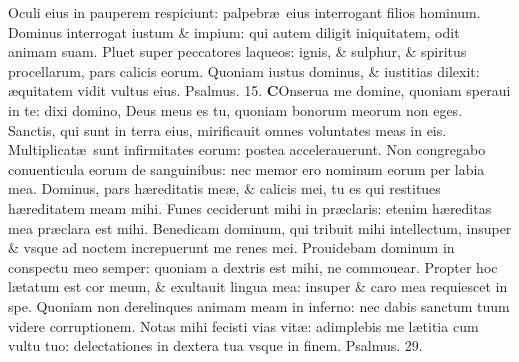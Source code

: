 \documentclass[a5paper,10pt]{book}
\def\ae{æ}
\begin{document}
\begin{multicols*}{2}
\newline \color{red} O\color{black}culi eius in pauperem respiciunt: palpebr\ae \ eius interrogant filios hominum.
\newline \color{red} D\color{black}ominus interrogat iustum \& impium: qui autem diligit iniquitatem, odit animam suam.
\newline \color{red} P\color{black}luet super peccatores laqueos: ignis, \& sulphur, \& spiritus procellarum, pars calicis eorum.
\newline \color{red} Q\color{black}uoniam iustus dominus, \& iustitias dilexit: \ae quitatem vidit vultus eius.
\newline \color{red} Psalmus. 15. \color{black}
\lettrine[lines=2]{\bfseries \color{red} C}{}Onserua me domine, quoniam speraui in te: dixi domino, Deus meus es tu, quoniam bonorum meorum non eges.
\newline \color{red} S\color{black}anctis, qui sunt in terra eius, mirificauit omnes voluntates meas in eis.
\newline \color{red} M\color{black}ultiplicat\ae \ sunt infirmitates eorum: postea accelerauerunt.
\newline \color{red} N\color{black}on congregabo conuenticula eorum de sanguinibus: nec memor ero nominum eorum per labia mea.
\newline \color{red} D\color{black}ominus, pars h\ae reditatis me\ae , \& calicis mei, tu es qui restitues h\ae reditatem meam mihi.
\newline \color{red} F\color{black}unes ceciderunt mihi in pr\ae claris: etenim h\ae reditas mea pr\ae clara est mihi.
\newline \color{red} B\color{black}enedicam dominum, qui tribuit mihi intellectum, insuper \& vsque ad noctem increpuerunt me renes mei.
\newline \color{red} P\color{black}rouidebam dominum in conspectu meo semper: quoniam a dextris est mihi, ne commouear.
\newline \color{red} P\color{black}ropter hoc l\ae tatum est cor meum, \& exultauit lingua mea: insuper \& caro mea requiescet in spe.
\newline \color{red} Q\color{black}uoniam non derelinques animam meam in inferno: nec dabis sanctum tuum videre corruptionem.
\newline \color{red} N\color{black}otas mihi fecisti vias vit\ae : adimplebis me l\ae titia cum vultu tuo: delectationes in dextera tua vsque in finem.
\newline \color{red} Psalmus. 29. \color{black}

\end{multicols*}
\end{document}
